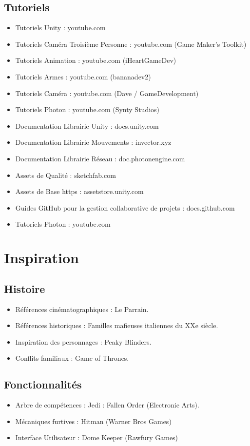 \documentclass{report}
\begin{document}
\subsection{Tutoriels}
\begin{itemize}
    \item Tutoriels Unity : youtube.com
    \item Tutoriels Caméra Troisième Personne : youtube.com (Game Maker's Toolkit)
    \item Tutoriels Animation : youtube.com (iHeartGameDev)
    \item Tutoriels Armes : youtube.com (bananadev2)
    \item Tutoriels Caméra : youtube.com (Dave / GameDevelopment)
    \item Tutoriels Photon : youtube.com (Synty Studios)
    \item Documentation Librairie Unity : docs.unity.com 
    \item Documentation Librairie Mouvements : invector.xyz
    \item Documentation Librairie Réseau : doc.photonengine.com
    \item Assets de Qualité : sketchfab.com
    \item Assets de Base https : assetstore.unity.com
    \item Guides GitHub pour la gestion collaborative de projets : docs.github.com
    \item Tutoriels Photon : youtube.com
\end{itemize}

\newpage
\section{Inspiration}
\subsection{Histoire}
\begin{itemize}
    \item Références cinématographiques : Le Parrain.
    \item Références historiques : Familles mafieuses italiennes du XXe siècle.
    \item Inspiration des personnages : Peaky Blinders.
    \item Conflits familiaux : Game of Thrones.
\end{itemize}

\subsection{Fonctionnalités}
\begin{itemize}
    \item Arbre de compétences : Jedi : Fallen Order (Electronic Arts).
    \item Mécaniques furtives : Hitman (Warner Bros Games)
    \item Interface Utilisateur : Dome Keeper (Rawfury Games)
    
\end{itemize}
\end{document}
